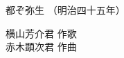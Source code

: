 ﻿\documentclass[10pt,b5j]{tarticle} %
\begin{document}
\thispagestyle{empty} %
\newcommand{\linespace}{0.4em} %
\newcommand{\blocksize}{0.33\hsize} %

\begin{minipage}[c]{0.7\hsize} %
    \begin{center}
        {\LARGE
            都ぞ弥生 %
        }
        {\small 
            （明治四十五年） %
        }
    \end{center}
\end{minipage}
\begin{minipage}[c]{0.3\hsize} %
    \begin{flushright} %
        横山芳介君 作歌\\ %
        赤木顕次君 作曲 %
    \end{flushright}
\end{minipage}


\vspace{0.8em} %
\end{document}
